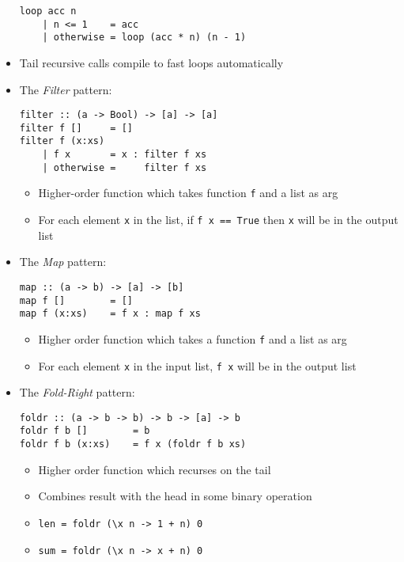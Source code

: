 \documentclass[landscape,8pt]{extarticle}
\newcommand{\code}{\lstinline}
\begin{document}
\begin{multicols}{3}
\begin{itemize}
              \begin{lstlisting}
loop acc n
    | n <= 1    = acc
    | otherwise = loop (acc * n) (n - 1)
              \end{lstlisting}
        \item Tail recursive calls compile to fast loops automatically
        \item The \emph{Filter} pattern:
              \begin{lstlisting}
filter :: (a -> Bool) -> [a] -> [a]
filter f []     = []
filter f (x:xs)
    | f x       = x : filter f xs
    | otherwise =     filter f xs
              \end{lstlisting}
              \begin{itemize}
                  \item Higher-order function which takes function \code{f} and a list as arg
                  \item For each element \code{x} in the list, if \code{f x == True} then \code{x} will be in the output list
              \end{itemize}
        \item The \emph{Map} pattern:
              \begin{lstlisting}
map :: (a -> b) -> [a] -> [b]
map f []        = []
map f (x:xs)    = f x : map f xs
              \end{lstlisting}
              \begin{itemize}
                  \item Higher order function which takes a function \code{f} and a list as arg
                  \item For each element \code{x} in the input list, \code{f x} will be in the output list
              \end{itemize}
        \item The \emph{Fold-Right} pattern:
              \begin{lstlisting}
foldr :: (a -> b -> b) -> b -> [a] -> b
foldr f b []        = b
foldr f b (x:xs)    = f x (foldr f b xs)
            \end{lstlisting}
              \begin{itemize}
                  \item Higher order function which recurses on the tail
                  \item Combines result with the head in some binary operation
                  \item \code{len = foldr (\x n -> 1 + n) 0}
                  \item \code{sum = foldr (\x n -> x + n) 0}

\end{itemize}
\end{itemize}
\end{multicols}
\end{document}
